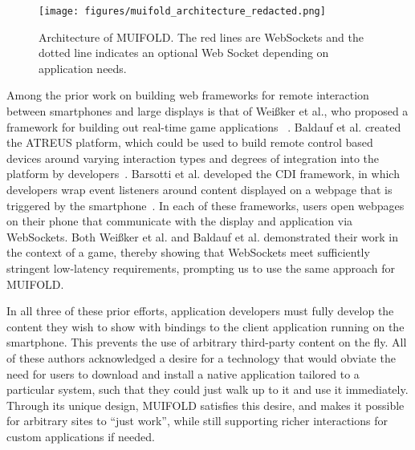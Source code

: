 \begin{figure}
\centering
  \texttt{[image: figures/muifold\_architecture\_redacted.png]}
  \caption{Architecture of MUIFOLD. The red lines are WebSockets and the dotted line indicates an optional Web Socket depending on application needs.}
  \label{fig:architecture_muifold}
\end{figure}

Among the prior work on building web frameworks for remote interaction between smartphones and large displays is that of
Weißker et al., who proposed a
framework for building out real-time game applications ~\cite{weisker_massive_2016}. Baldauf et al. created the ATREUS
platform, which could be used to build remote control based
devices around varying interaction types and degrees of integration
into the platform by developers~\cite{baldauf_your_2016}. Barsotti
et al. developed the CDI framework, in which developers wrap event listeners around content displayed on a webpage
that is triggered by the smartphone~\cite{barsotti_web_2017}.
In each of these frameworks, users open webpages on their phone that communicate with the display and application via WebSockets.
Both Weißker et al. and Baldauf et al. demonstrated their
work in the context of a game, thereby showing that
WebSockets meet sufficiently stringent low-latency requirements, prompting us to use the same approach for MUIFOLD.

In all three of these prior efforts, application
developers must fully develop the content they wish to show with bindings to the client application running on the smartphone. This prevents the use of arbitrary third-party content on the fly.
All of these authors acknowledged a desire for a technology that would obviate the need for users to download and install a native application tailored to a particular system, such that they could just walk up to it and use it immediately. Through its unique design, MUIFOLD satisfies this desire, and makes it possible for arbitrary sites to ``just work'', while still supporting richer interactions for custom applications if needed.
